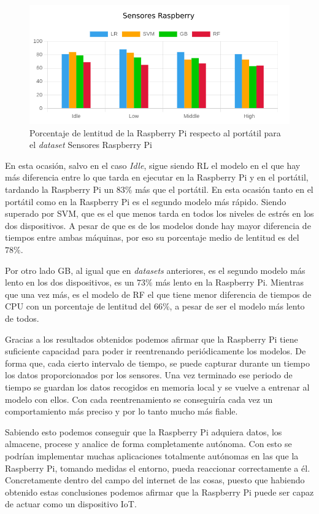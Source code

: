 \documentclass[a4paper, 12pt]{book}
\begin{document}
\begin{figure}[htb]
  \centering
  \includegraphics[width=14cm, keepaspectratio]{img/per_mi.png}
  \caption{Porcentaje de lentitud de la Raspberry Pi respecto al portátil para el \textit{dataset} Sensores Raspberry Pi}
  \label{fig:per_Mi}
\end{figure}

En esta ocasión, salvo en el caso \textit{Idle}, sigue siendo RL el modelo en el que hay más diferencia entre lo que tarda en ejecutar en la Raspberry Pi y en el portátil, tardando la Raspberry Pi un $83\%$ más que el portátil. En esta ocasión tanto en el portátil como en la Raspberry Pi es el segundo modelo más rápido. Siendo superado por SVM, que es el que menos tarda en todos los niveles de estrés en los dos dispositivos. A pesar de que es de los modelos donde hay mayor diferencia de tiempos entre ambas máquinas, por eso su porcentaje medio de lentitud es del $78\%$.

Por otro lado GB, al igual que en \textit{datasets} anteriores, es el segundo modelo más lento en los dos dispositivos, es un $73\%$ más lento en la Raspberry Pi. Mientras que una vez más, es el modelo de RF el que tiene menor diferencia de tiempos de CPU con un porcentaje de lentitud del $66\%$, a pesar de ser el modelo más lento de todos.

Gracias a los resultados obtenidos podemos afirmar que la Raspberry Pi tiene suficiente capacidad para poder ir reentrenando periódicamente los modelos. De forma que, cada cierto intervalo de tiempo, se puede capturar durante un tiempo los datos proporcionados por los sensores. Una vez terminado ese periodo de tiempo se guardan los datos recogidos en memoria local y se vuelve a entrenar al modelo con ellos. Con cada reentrenamiento se conseguiría cada vez un comportamiento más preciso y por lo tanto mucho más fiable.

Sabiendo esto podemos conseguir que la Raspberry Pi adquiera datos, los almacene, procese y analice de forma completamente autónoma. Con esto se podrían implementar muchas aplicaciones totalmente autónomas en las que la Raspberry Pi, tomando medidas el entorno, pueda reaccionar correctamente a él. Concretamente dentro del campo del internet de las cosas, puesto que habiendo obtenido estas conclusiones podemos afirmar que la Raspberry Pi puede ser capaz de actuar como un dispositivo IoT.
\end{document}
